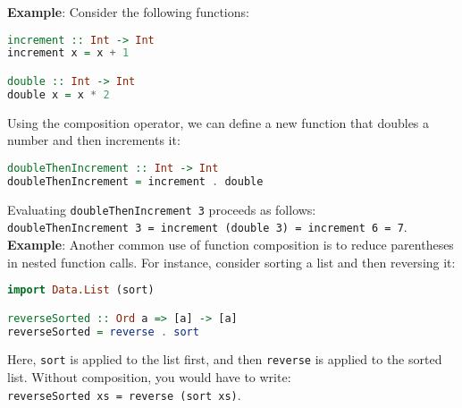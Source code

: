 \noindent
\textbf{Example}:
Consider the following functions:
\begin{lstlisting}[language=Haskell]
increment :: Int -> Int
increment x = x + 1

double :: Int -> Int
double x = x * 2
\end{lstlisting}
Using the composition operator, we can define a new function that doubles a number and then increments it:
\begin{lstlisting}[language=Haskell]
doubleThenIncrement :: Int -> Int
doubleThenIncrement = increment . double
\end{lstlisting}
Evaluating \texttt{doubleThenIncrement 3} proceeds as follows:
\\[0.2cm]
\hspace*{1.3cm}
\texttt{doubleThenIncrement 3 = increment (double 3) = increment 6 = 7}.
\\[0.2cm]
\textbf{Example}:
Another common use of function composition is to reduce parentheses in nested function calls. For instance, consider sorting a list and then reversing it:
\begin{lstlisting}[language=Haskell]
import Data.List (sort)

reverseSorted :: Ord a => [a] -> [a]
reverseSorted = reverse . sort
\end{lstlisting}
Here, \texttt{sort} is applied to the list first, and then \texttt{reverse} is applied to the sorted list. Without composition, you would have to write:
\\[0.2cm]
\hspace*{1.3cm}
\texttt{reverseSorted xs = reverse (sort xs)}.
\vspace*{0.2cm}


